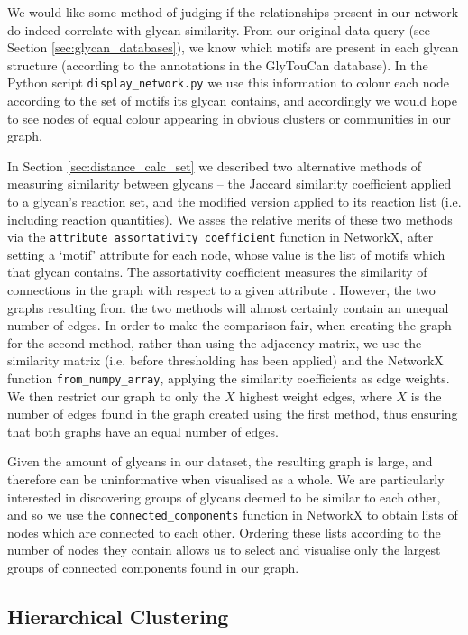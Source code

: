 \documentclass[12pt,a4paper]{article}
\begin{document}
We would like some method of judging if the relationships present in our network do indeed correlate with glycan similarity. From our original data query (see Section \ref{sec:glycan_databases}), we know which motifs are present in each glycan structure (according to the annotations in the GlyTouCan database). In the Python script \texttt{display\_network.py} we use this information to colour each node according to the set of motifs its glycan contains, and accordingly we would hope to see nodes of equal colour appearing in obvious clusters or communities in our graph.

In Section \ref{sec:distance_calc_set} we described two alternative methods of measuring similarity between glycans -- the Jaccard similarity coefficient applied to a glycan's reaction set, and the modified version applied to its reaction list (i.e. including reaction quantities). We asses the relative merits of these two methods via the \texttt{attribute\_assortativity\_coefficient} function in NetworkX, after setting a `motif' attribute for each node, whose value is the list of motifs which that glycan contains. The assortativity coefficient measures the similarity of connections in the graph with respect to a given attribute \citep{newman2003mixing}. However, the two graphs resulting from the two methods will almost certainly contain an unequal number of edges. In order to make the comparison fair, when creating the graph for the second method, rather than using the adjacency matrix, we use the similarity matrix (i.e. before thresholding has been applied) and the NetworkX function \texttt{from\_numpy\_array}, applying the similarity coefficients as edge weights. We then restrict our graph to only the $X$ highest weight edges, where $X$ is the number of edges found in the graph created using the first method, thus ensuring that both graphs have an equal number of edges.

Given the amount of glycans in our dataset, the resulting graph is large, and therefore can be uninformative when visualised as a whole. We are particularly interested in discovering groups of glycans deemed to be similar to each other, and so we use the \texttt{connected\_components} function in NetworkX to obtain lists of nodes which are connected to each other. Ordering these lists according to the number of nodes they contain allows us to select and visualise only the largest groups of connected components found in our graph. 

\subsection{Hierarchical Clustering}
\label{sec:clustering}
\end{document}
